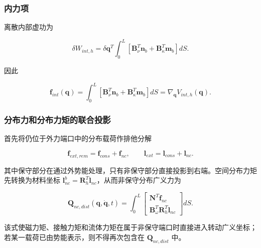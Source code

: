 \subsubsection{内力项}\label{sec:galerkin-2-5-2}

离散内部虚功为

\begin{equation}
\label{eq:galerkin-2-69}
\delta W_{int,h} = \delta\mathbf{q}^{T}\int_{0}^{L}\left\lbrack \mathbf{B}_{\nu}^{T}\mathbf{n}_{b} + \mathbf{B}_{\kappa}^{T}\mathbf{m}_{b} \right\rbrack dS.
\end{equation}

因此

\begin{equation}
\label{eq:galerkin-2-70}
\mathbf{f}_{int}\left( \mathbf{q} \right) = \int_{0}^{L}\left\lbrack \mathbf{B}_{\nu}^{T}\mathbf{n}_{b} + \mathbf{B}_{\kappa}^{T}\mathbf{m}_{b} \right\rbrack dS = \nabla_{\mathbf{q}}V_{int,h}\left( \mathbf{q} \right).
\end{equation}

\subsubsection{分布力和分布力矩的联合投影}\label{sec:galerkin-2-5-3}

首先将仍位于外力端口中的分布载荷作排他分解

\begin{equation}
\label{eq:galerkin-2-71}
\mathbf{f}_{ext,rem} = \mathbf{f}_{cons} + \mathbf{f}_{nc},\quad\quad\mathbf{l}_{ext} = \mathbf{l}_{cons} + \mathbf{l}_{nc}.
\end{equation}

其中保守部分在通过外势能处理，只有非保守部分直接投影到右端。空间分布力矩先转换为材料坐标 \(\mathbf{l}_{nc}^{b} = \mathbf{R}_{h}^{T}\mathbf{l}_{nc}\)，从而非保守分布广义力为

\begin{equation}
\label{eq:galerkin-2-72}
\boxed{\mathbf{Q}_{nc,dist}\left( \mathbf{q},\dot{\mathbf{q}},t \right) = \int_{0}^{L}\begin{bmatrix}
\mathbf{N}^{T}\mathbf{f}_{nc} \\
\mathbf{B}_{\omega}^{T}\mathbf{R}_{h}^{T}\mathbf{l}_{nc}
\end{bmatrix}dS.}
\end{equation}

该式使磁力矩、接触力矩和流体力矩在属于非保守端口时直接进入转动广义坐标；若某一载荷已由势能表示，则不得再次包含在 \(\mathbf{Q}_{nc,dist}\) 中。

